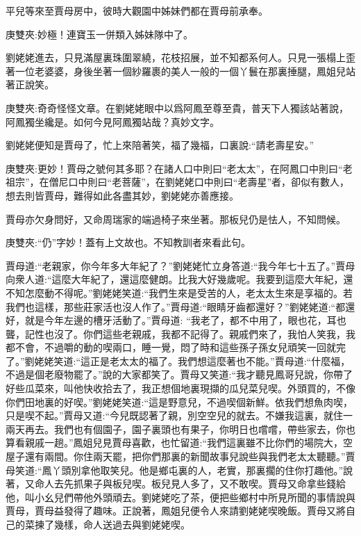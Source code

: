 \begin{parag}
    平兒等來至賈母房中，彼時大觀園中姊妹們都在賈母前承奉。\begin{note}庚雙夾:妙極！連寶玉一併類入姊妹隊中了。\end{note}劉姥姥進去，只見滿屋裏珠圍翠繞，花枝招展，並不知都系何人。只見一張榻上歪著一位老婆婆，身後坐著一個紗羅裹的美人一般的一個丫鬟在那裏捶腿，鳳姐兒站著正說笑。\begin{note}庚雙夾:奇奇怪怪文章。在劉姥姥眼中以爲阿鳳至尊至貴，普天下人獨該站著說，阿鳳獨坐纔是。如何今見阿鳳獨站哉？真妙文字。\end{note}劉姥姥便知是賈母了，忙上來陪著笑，福了幾福，口裏說:“請老壽星安。”\begin{note}庚雙夾:更妙！賈母之號何其多耶？在諸人口中則曰“老太太”，在阿鳳口中則曰“老祖宗”，在僧尼口中則曰“老菩薩”，在劉姥姥口中則曰“老壽星”者，卻似有數人，想去則皆賈母，難得如此各盡其妙，劉姥姥亦善應接。\end{note}賈母亦欠身問好，又命周瑞家的端過椅子來坐著。那板兒仍是怯人，不知問候。\begin{note}庚雙夾:“仍”字妙！蓋有上文故也。不知教訓者來看此句。\end{note}賈母道:“老親家，你今年多大年紀了？”劉姥姥忙立身答道:“我今年七十五了。”賈母向衆人道:“這麼大年紀了，還這麼健朗。比我大好幾歲呢。我要到這麼大年紀，還不知怎麼動不得呢。”劉姥姥笑道:“我們生來是受苦的人，老太太生來是享福的。若我們也這樣，那些莊家活也沒人作了。”賈母道:“眼睛牙齒都還好？”劉姥姥道:“都還好，就是今年左邊的槽牙活動了。”賈母道: “我老了，都不中用了，眼也花，耳也聾，記性也沒了。你們這些老親戚，我都不記得了。親戚們來了，我怕人笑我，我都不會，不過嚼的動的喫兩口，睡一覺，悶了時和這些孫子孫女兒頑笑一回就完了。”劉姥姥笑道:“這正是老太太的福了。我們想這麼著也不能。”賈母道:“什麼福，不過是個老廢物罷了。”說的大家都笑了。賈母又笑道:“我才聽見鳳哥兒說，你帶了好些瓜菜來，叫他快收拾去了，我正想個地裏現擷的瓜兒菜兒喫。外頭買的，不像你們田地裏的好喫。”劉姥姥笑道:“這是野意兒，不過喫個新鮮。依我們想魚肉喫，只是喫不起。”賈母又道:“今兒既認著了親，別空空兒的就去。不嫌我這裏，就住一兩天再去。我們也有個園子，園子裏頭也有果子，你明日也嚐嚐，帶些家去，你也算看親戚一趟。”鳳姐兒見賈母喜歡，也忙留道:“我們這裏雖不比你們的場院大，空屋子還有兩間。你住兩天罷，把你們那裏的新聞故事兒說些與我們老太太聽聽。”賈母笑道:“鳳丫頭別拿他取笑兒。他是鄉屯裏的人，老實，那裏擱的住你打趣他。”說著，又命人去先抓果子與板兒喫。板兒見人多了，又不敢喫。賈母又命拿些錢給他，叫小幺兒們帶他外頭頑去。劉姥姥吃了茶，便把些鄉村中所見所聞的事情說與賈母，賈母益發得了趣味。正說著，鳳姐兒便令人來請劉姥姥喫晚飯。賈母又將自己的菜揀了幾樣，命人送過去與劉姥姥喫。
\end{parag}


